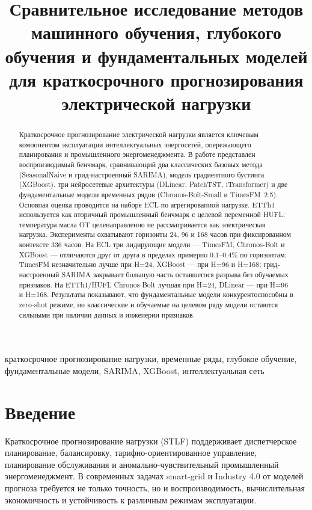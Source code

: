 \documentclass[conference]{IEEEtran}
\title{Сравнительное исследование методов машинного обучения, глубокого обучения и фундаментальных моделей для краткосрочного прогнозирования электрической нагрузки}
\author{
\IEEEauthorblockN{Автор Один}
\IEEEauthorblockA{\textit{Аффилиация Один}\\
Город, Страна\\
email1@example.com}
\and
\IEEEauthorblockN{Автор Два}
\IEEEauthorblockA{\textit{Аффилиация Два}\\
Город, Страна\\
email2@example.com}
}
\begin{document}
\maketitle

\begin{abstract}
Краткосрочное прогнозирование электрической нагрузки является ключевым компонентом эксплуатации интеллектуальных энергосетей, опережающего планирования и промышленного энергоменеджмента. В работе представлен воспроизводимый бенчмарк, сравнивающий два классических базовых метода (SeasonalNaive и грид-настроенный SARIMA), модель градиентного бустинга (XGBoost), три нейросетевые архитектуры (DLinear, PatchTST, iTransformer) и две фундаментальные модели временных рядов (Chronos-Bolt-Small и TimesFM~2.5). Основная оценка проводится на наборе ECL по агрегированной нагрузке. ETTh1 используется как вторичный промышленный бенчмарк с целевой переменной HUFL; температура масла OT целенаправленно не рассматривается как электрическая нагрузка. Эксперименты охватывают горизонты 24, 96 и 168 часов при фиксированном контексте 336 часов. На ECL три лидирующие модели --- TimesFM, Chronos-Bolt и XGBoost --- отличаются друг от друга в пределах примерно $0.1$--$0.4\%$ по горизонтам: TimesFM незначительно лучше при H=24, XGBoost --- при H=96 и H=168; грид-настроенный SARIMA закрывает большую часть оставшегося разрыва без обучаемых признаков. На ETTh1/HUFL Chronos-Bolt лучшая при H=24, DLinear --- при H=96 и H=168. Результаты показывают, что фундаментальные модели конкурентоспособны в zero-shot режиме, но классические и обучаемые на целевом ряду модели остаются сильными при наличии данных и инженерии признаков.
\end{abstract}

\begin{IEEEkeywords}
краткосрочное прогнозирование нагрузки, временные ряды, глубокое обучение, фундаментальные модели, SARIMA, XGBoost, интеллектуальная сеть
\end{IEEEkeywords}

\section{Введение}
Краткосрочное прогнозирование нагрузки (STLF) поддерживает диспетчерское планирование, балансировку, тарифно-ориентированное управление, планирование обслуживания и аномально-чувствительный промышленный энергоменеджмент. В современных задачах smart-grid и Industry 4.0 от моделей прогноза требуется не только точность, но и воспроизводимость, вычислительная экономичность и устойчивость к различным режимам эксплуатации.
\end{document}
